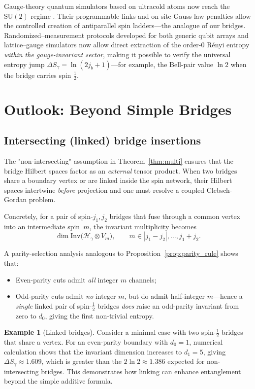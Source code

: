 \documentclass[11pt, a4paper]{article}
\theoremstyle{plain}
\theoremstyle{definition}
\newtheorem{example}{Example}
\theoremstyle{remark}
\newcommand{\Hil}{\mathcal{H}}
\newcommand{\Inv}{\mathrm{Inv}}
\newcommand{\SU}{\mathrm{SU}}
\begin{document}
Gauge-theory quantum simulators based on ultracold atoms now reach the $\SU(2)$ regime \cite{Zohar2022GaugeSim}. Their programmable links and on-site Gauss-law penalties allow the controlled creation of antiparallel spin ladders—the analogue of our bridges. 
Randomized–measurement protocols developed for both generic qubit arrays and lattice–gauge simulators
\cite{Brydges2019,Bringewatt2024,Leone2022} now allow direct extraction of the order-0 R\'enyi entropy \emph{within the
gauge-invariant sector}, making it possible to verify the universal entropy
jump $\Delta S_{\gamma}=\ln(2j_b+1)$—for example, the Bell-pair value $\ln 2$ when the bridge carries spin $\tfrac12$.

\section{Outlook: Beyond Simple Bridges}
\label{sec:outlook}

\subsection{Intersecting (linked) bridge insertions}
\label{sec:intersecting}

The "non-intersecting" assumption in Theorem~\ref{thm:multi} ensures that the bridge Hilbert spaces factor as an \emph{external} tensor product. When two bridges share a boundary vertex or are linked inside the spin network, their Hilbert spaces intertwine \emph{before} projection and one must resolve a coupled Clebsch-Gordan problem.

Concretely, for a pair of spin-$j_{1},j_{2}$ bridges that fuse through a common vertex into an intermediate spin~$m$, the invariant multiplicity becomes
\[  \dim \Inv\!\bigl(\Hil_{\gamma}\otimes V_{m}\bigr),  \qquad  m\in |j_{1}-j_{2}|,\dots,j_{1}+j_{2}.\]

A parity-selection analysis analogous to Proposition~\ref{prop:parity_rule} shows that:
\begin{itemize}\setlength\itemsep{4pt}
\item Even-parity cuts admit \emph{all} integer $m$ channels;
\item Odd-parity cuts admit \emph{no} integer $m$, but do admit half-integer $m$—hence a \emph{single} linked pair of spin-$\frac{1}{2}$ bridges \emph{does} raise an odd-parity invariant from zero to $d_{0}$, giving the first non-trivial entropy.
\end{itemize}

\begin{example}[Linked bridges]
Consider a minimal case with two spin-$\frac{1}{2}$ bridges that share a vertex. For an even-parity boundary with $d_0=1$, numerical calculation shows that the invariant dimension increases to $d_1=5$, giving $\Delta S_{\gamma} \approx 1.609$, which is greater than the $2\ln 2 \approx 1.386$ expected for non-intersecting bridges. This demonstrates how linking can enhance entanglement beyond the simple additive formula.
\end{example}
\end{document}
